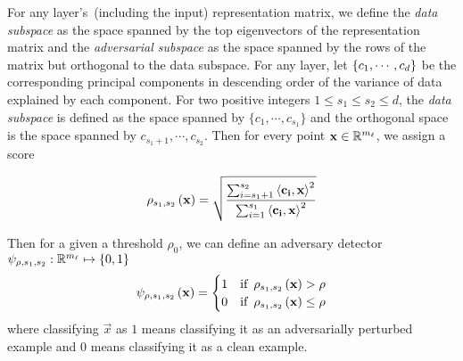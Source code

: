 For any layer's~(including the input) representation matrix, we define the {\em
data subspace} as the space spanned by the top eigenvectors of the
representation matrix and the {\em adversarial subspace} as the space spanned by
the rows of the matrix but orthogonal to the data subspace. For any layer, let
\(\left\{{c_1,\cdots,c_d}\right\}\) be the corresponding principal components in descending
order of the variance of data explained by each component. For two positive
integers \(1\le s_1\le s_2\le d\), the {\em data subspace} is defined as the
space spanned by \(\{c_1,\cdots,c_{s_1}\}\) and the orthogonal space is the
space spanned by \(c_{s_1+1},\cdots,c_{s_2}\). Then for every point
\({\mathbf{x}}\in\mathbb{R}^{m_\ell}\), we assign a score 

\begin{equation}\label{eq:energy-ratio-score-fn}
  \rho_{s_1,s_2}\left({{\mathbf{x}}}\right) = \sqrt{\dfrac{\sum_{i=s_1+1}^{s_2}\left\langle{{\mathbf{c_i}}},{{\mathbf{x}}}\right\rangle^2}{ \sum_{i=1}^{s_1} \left\langle{{\mathbf{c_i}}},{{\mathbf{x}}}\right\rangle^2}}
\end{equation}

Then for a given a threshold \(\rho_0\), we can define an adversary detector
\(\psi_{\rho,s_1,s_2}:\mathbb{R}^{m_\ell}\mapsto \left\{{0,1}\right\}\)
\[ \psi_{\rho,s_1,s_2}\left({{\mathbf{x}}}\right) = \begin{cases} \label{eq:detector-fn}
  1 & \text{if}\enskip \rho_{s_1,s_2}\left({{\mathbf{x}}}\right)  >\rho \\
  0  & \text{if}\enskip  \rho_{s_1,s_2}\left({{\mathbf{x}}}\right)  \le \rho
\end{cases}
\]
 where classifying \(\vec{x}\) as \(1\) means classifying it as an adversarially perturbed example and \(0\) means classifying it as a clean example.


